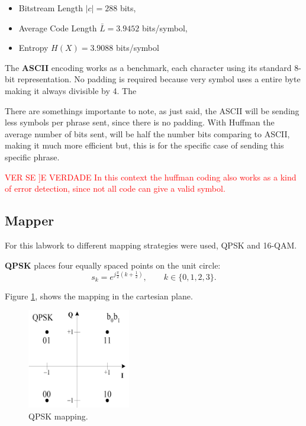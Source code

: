 \begin{itemize}
  \item Bitstream Length $\lvert c\rvert = 288$ bits,
  \item Average Code Length $\bar L = 3.9452$ bits/symbol,
  \item Entropy $H(X)=3.9088$ bits/symbol
\end{itemize}



The \textbf{ASCII} encoding works as a benchmark, each character using its standard 8-bit representation. No padding is required because very symbol uses a entire byte making it always divisible by 4. The 

There are somethings importante to note, as just said, the ASCII will be sending less symbols per phrase sent, since there is no padding. With Huffman the average number of bits sent, will be half the number bits comparing to ASCII, making it much more efficient but, this is for the specific case of sending this specific phrase. 

\textcolor{red}{VER SE ]E VERDADE  In this context the huffman coding also works as a kind of error detection, since not all code can give a valid symbol.}

\subsection{Mapper}

For this labwork to different mapping strategies were used, QPSK and 16-QAM.

\textbf{QPSK} places four equally spaced points on the unit circle:
\[
s_k = e^{j\frac{\pi}{2}\left(k+\tfrac12\right)}, \qquad k\in\{0,1,2,3\}.
\]

Figure \ref{fig:QPKS_Mapping}, shows the mapping in the cartesian plane.

\begin{figure}[h]
  \centering
  \includegraphics[width=0.4\textwidth]{Images/QPKS_Mapping.png}
  \caption{QPSK mapping.\cite{Sadough2012_UWB_OFDM}}
  \label{fig:QPKS_Mapping}
\end{figure}

